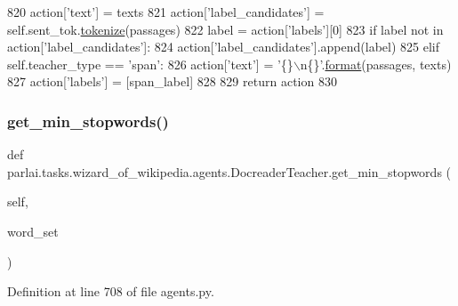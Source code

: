 \begin{DoxyCode}
820             action[\textcolor{stringliteral}{'text'}] = texts
821             action[\textcolor{stringliteral}{'label\_candidates'}] = self.sent\_tok.\hyperlink{namespaceparlai_1_1agents_1_1tfidf__retriever_1_1build__tfidf_a1fdb457e98eb4e4c26047e229686a616}{tokenize}(passages)
822             label = action[\textcolor{stringliteral}{'labels'}][0]
823             \textcolor{keywordflow}{if} label \textcolor{keywordflow}{not} \textcolor{keywordflow}{in} action[\textcolor{stringliteral}{'label\_candidates'}]:
824                 action[\textcolor{stringliteral}{'label\_candidates'}].append(label)
825         \textcolor{keywordflow}{elif} self.teacher\_type == \textcolor{stringliteral}{'span'}:
826             action[\textcolor{stringliteral}{'text'}] = \textcolor{stringliteral}{'\{\}\(\backslash\)n\{\}'}.\hyperlink{namespaceparlai_1_1chat__service_1_1services_1_1messenger_1_1shared__utils_a32e2e2022b824fbaf80c747160b52a76}{format}(passages, texts)
827             action[\textcolor{stringliteral}{'labels'}] = [span\_label]
828 
829         \textcolor{keywordflow}{return} action
830 
\end{DoxyCode}
\mbox{\label{classparlai_1_1tasks_1_1wizard__of__wikipedia_1_1agents_1_1DocreaderTeacher_a5dba8f178a059e0daae7fec42bfc4330}} 
\subsubsection{\texorpdfstring{get\+\_\+min\+\_\+stopwords()}{get\_min\_stopwords()}}
{\footnotesize\ttfamily def parlai.\+tasks.\+wizard\+\_\+of\+\_\+wikipedia.\+agents.\+Docreader\+Teacher.\+get\+\_\+min\+\_\+stopwords (\begin{DoxyParamCaption}\item[{}]{self,  }\item[{}]{word\+\_\+set }\end{DoxyParamCaption})}



Definition at line 708 of file agents.\+py.


